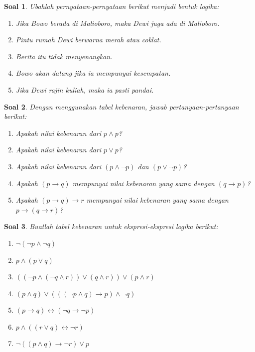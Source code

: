 \documentclass[12pt,a4paper]{article}
\theoremstyle{soaljarak}
\newtheorem{soal}{Soal}
\begin{document}
\begin{soal}
  Ubahlah pernyataan-pernyataan berikut menjadi bentuk logika:
  \begin{enumerate}
    \item Jika Bowo berada di Malioboro, maka Dewi juga ada di Malioboro.
    \item Pintu rumah Dewi berwarna merah atau coklat.
    \item Berita itu tidak menyenangkan.
    \item Bowo akan datang jika ia mempunyai kesempatan.
    \item Jika Dewi rajin kuliah, maka ia pasti pandai.
  \end{enumerate}
\end{soal}

\begin{soal}
  Dengan menggunakan tabel kebenaran, jawab pertanyaan-pertanyaan berikut:
  \begin{enumerate}
    \item Apakah nilai kebenaran dari $p \wedge p$?
    \item Apakah nilai kebenaran dari $p \vee p$?
    \item Apakah nilai kebenaran dari $(p \wedge \neg p)$ dan $(p \vee \neg p)$?
    \item Apakah $(p \rightarrow q)$ mempunyai nilai kebenaran yang sama dengan $(q \rightarrow p)$?
    \item Apakah $(p \rightarrow q) \rightarrow r$ mempunyai nilai kebenaran yang sama dengan $p \rightarrow (q \rightarrow r)$?
  \end{enumerate}
\end{soal}

\begin{soal}
  Buatlah tabel kebenaran untuk ekspresi-ekspresi logika berikut:
  \begin{enumerate}
    \item $\neg (\neg p \wedge \neg q)$
    \item $p \wedge (p \vee q)$
    \item $((\neg p \wedge (\neg q \wedge r))\vee (q \wedge r))\vee (p \wedge r)$
    \item $(p \wedge q)\vee (((\neg p \wedge q) \rightarrow p)\wedge \neg q)$
    \item $(p \rightarrow q)\leftrightarrow (\neg q \rightarrow \neg p)$
    \item $p \wedge ((r \vee q) \leftrightarrow \neg r)$
    \item $\neg((p \wedge q)\rightarrow \neg r)\vee p$
  \end{enumerate}
\end{soal}
\end{document}
